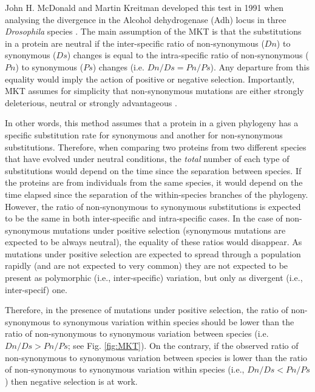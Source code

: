 John H. McDonald and Martin Kreitman developed this test in 1991 when analysing the divergence in the Alcohol dehydrogenase (Adh) locus in three \textit{Drosophila} species	\citep{McDonald1991}. 
%
The main assumption of the MKT is that the substitutions in a protein are neutral if the inter-specific ratio of non-synonymous ($Dn$) to synonymous ($Ds$) changes is equal to the intra-specific ratio of non-synonymous ($Pn$) to synonymous ($Ps$) changes (i.e. $Dn/Ds = Pn/Ps$).
Any departure from this equality would imply the action of positive or negative selection.
%
Importantly, MKT assumes for simplicity that non-synonymous mutations are either strongly deleterious, neutral or strongly advantageous \citep{McDonald1991}.
%

In other words, this method assumes that a protein in a given phylogeny has a specific substitution rate for synonymous and another for non-synonymous substitutions. Therefore, when comparing two proteins from two different species that have evolved under neutral conditions, the \textit{total} number of each type of substitutions would depend on the time since the separation between species. If the proteins are from individuals from the same species, it would depend on the time elapsed since the separation of the within-species branches of the phylogeny.
However, the ratio of non-synonymous to synonymous substitutions is expected to be the same in both inter-specific and intra-specific cases. 
In the case of non-synonymous mutations under positive selection (synonymous mutations are expected to be always neutral), the equality of these ratios would disappear. As mutations under positive selection are expected to spread through a population rapidly (and are not expected to very common) they are not expected to be present as polymorphic (i.e., inter-specific) variation, but only as divergent (i.e., inter-specif) one.

Therefore, in the presence of mutations under positive selection, the ratio of non-synonymous to synonymous variation within species should be lower than the ratio of non-synonymous to synonymous variation between species (i.e. $Dn/Ds > Pn/Ps$; see Fig. \ref{fig:MKT}). 
On the contrary, if the observed ratio of non-synonymous to synonymous variation between species is lower than the ratio of non-synonymous to synonymous variation within species (i.e., $Dn/Ds < Pn/Ps$) then negative selection is at work.
%


